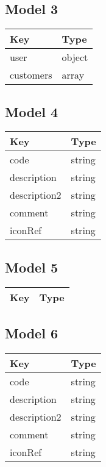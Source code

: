 \documentclass[10pt]{article}
\begin{document}
            \subsection{Model 3}
            
            \begin{tabularx}{\textwidth}{lZ}
                \textbf{Key} & \textbf{Type} \\
                \hline
                    user & object \\
                    customers & array \\
            \end{tabularx}
            \subsection{Model 4}
            
            \begin{tabularx}{\textwidth}{lZ}
                \textbf{Key} & \textbf{Type} \\
                \hline
                    code & string \\
                    description & string \\
                    description2 & string \\
                    comment & string \\
                    iconRef & string \\
            \end{tabularx}
            \subsection{Model 5}
            
            \begin{tabularx}{\textwidth}{lZ}
                \textbf{Key} & \textbf{Type} \\
                \hline
            \end{tabularx}
            \subsection{Model 6}
            
            \begin{tabularx}{\textwidth}{lZ}
                \textbf{Key} & \textbf{Type} \\
                \hline
                    code & string \\
                    description & string \\
                    description2 & string \\
                    comment & string \\
                    iconRef & string \\
            \end{tabularx}
\end{document}
